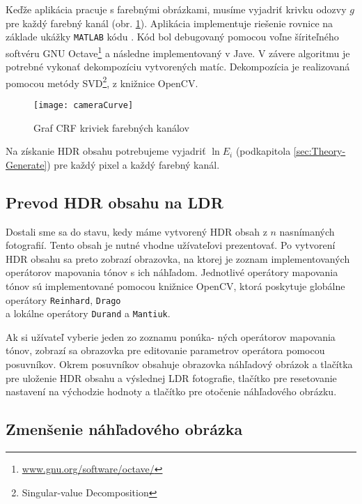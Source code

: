 \documentclass[slovak]{ExcelAtFIT}
\begin{document}
Keďže aplikácia pracuje s farebnými obrázkami, musíme vyjadriť krivku odozvy $g$ pre každý farebný kanál
(obr. \ref{fig:CameraCurve}). Aplikácia implementuje riešenie rovnice na základe ukážky \texttt{MATLAB}
kódu \cite{Debevec}. Kód bol
debugovaný pomocou voľne šíriteľného softvéru GNU Octave\footnote{\url{www.gnu.org/software/octave/}}
a následne implementovaný v Jave. V závere algoritmu je potrebné vykonať dekompozíciu vytvorených matíc. Dekompozícia
je realizovaná pomocou metódy SVD\footnote{Singular-value Decomposition}, z knižnice OpenCV.

\begin{figure}[t]
  \centering
  \texttt{[image: cameraCurve]}
  \caption{Graf CRF kriviek farebných kanálov}
  \label{fig:CameraCurve}
\end{figure}

Na získanie HDR obsahu potrebujeme vyjadriť $\ln E_{i}$ (podkapitola \ref{sec:Theory-Generate}) pre každý pixel
a každý farebný kanál.

\subsection{Prevod HDR obsahu na LDR}
\label{sec:Implement-TMO}

Dostali sme sa do stavu, kedy máme vytvorený HDR obsah z $n$ nasnímaných fotografií. Tento obsah je nutné vhodne užívateľovi prezentovať.
Po vytvorení HDR obsahu sa preto zobrazí obrazovka, na ktorej je zoznam implementovaných operátorov mapovania tónov s ich náhľadom.
Jednotlivé operátory mapovania tónov sú implementované pomocou knižnice OpenCV, ktorá poskytuje globálne operátory \texttt{Reinhard},
\texttt{Drago}\\a lokálne operátory \texttt{Durand} a \texttt{Mantiuk}.

Ak si užívateľ vyberie jeden zo zoznamu ponúka- ných operátorov mapovania tónov, zobrazí sa obrazovka pre editovanie parametrov operátora
pomocou posuvníkov. Okrem posuvníkov obsahuje obrazovka náhľadový obrázok a tlačítka pre uloženie HDR obsahu a výslednej LDR fotografie,
tlačítko pre resetovanie nastavení na východzie hodnoty a tlačítko pre otočenie náhľadového obrázku.

\subsection*{Zmenšenie náhľadového obrázka}
\end{document}
